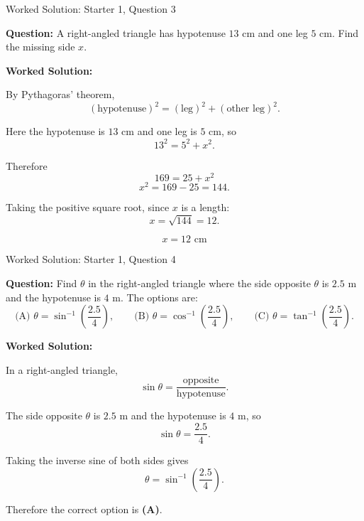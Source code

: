 \documentclass[aspectratio=169]{beamer}
\begin{document}
\begin{frame}{Worked Solution: Starter 1, Question 3}

\textbf{Question:} A right-angled triangle has hypotenuse \(13\) cm and one leg \(5\) cm. Find the missing side \(x\).

\textbf{Worked Solution:}

By Pythagoras' theorem,
\[
(\text{hypotenuse})^2 = (\text{leg})^2 + (\text{other leg})^2.
\]

Here the hypotenuse is \(13\) cm and one leg is \(5\) cm, so
\[
13^2 = 5^2 + x^2.
\]

Therefore
\[
169 = 25 + x^2
\]
\[
x^2 = 169 - 25 = 144.
\]

Taking the positive square root, since \(x\) is a length:
\[
x = \sqrt{144} = 12.
\]

\[
\boxed{x = 12\text{ cm}}
\]

\end{frame}

\begin{frame}{Worked Solution: Starter 1, Question 4}

\textbf{Question:} Find \(\theta\) in the right-angled triangle where the side opposite \(\theta\) is \(2.5\) m and the hypotenuse is \(4\) m. The options are:
\[
\text{(A) } \theta = \sin^{-1}\!\left(\frac{2.5}{4}\right),\qquad
\text{(B) } \theta = \cos^{-1}\!\left(\frac{2.5}{4}\right),\qquad
\text{(C) } \theta = \tan^{-1}\!\left(\frac{2.5}{4}\right).
\]

\textbf{Worked Solution:}

In a right-angled triangle,
\[
\sin\theta = \frac{\text{opposite}}{\text{hypotenuse}}.
\]

The side opposite \(\theta\) is \(2.5\) m and the hypotenuse is \(4\) m, so
\[
\sin\theta = \frac{2.5}{4}.
\]

Taking the inverse sine of both sides gives
\[
\theta = \sin^{-1}\!\left(\frac{2.5}{4}\right).
\]

Therefore the correct option is \textbf{(A)}.

\end{frame}
\end{document}
